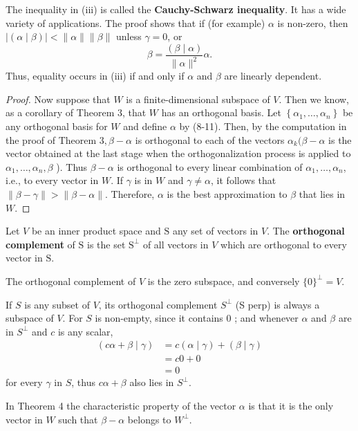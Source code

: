 \documentclass[main.tex]{subfiles}
\begin{document}
The inequality in (iii) is called the \textbf{Cauchy-Schwarz inequality}. It has a wide variety of applications. The proof shows that if (for example) $\alpha$ is non-zero, then $|(\alpha \mid \beta)|<\|\alpha\|\|\beta\|$ unless $\gamma = 0$, or
$$
\beta=\frac{(\beta \mid \alpha)}{\|\alpha\|^2} \alpha .
$$
Thus, equality occurs in (iii) if and only if $\alpha$ and $\beta$ are linearly dependent.


\begin{proof}
    Now suppose that $W$ is a finite-dimensional subspace of $V$. Then we know, as a corollary of Theorem 3, that $W$ has an orthogonal basis. Let $\left\{\alpha_1, \ldots, \alpha_n\right\}$ be any orthogonal basis for $W$ and define $\alpha$ by (8-11). Then, by the computation in the proof of Theorem $3, \beta-\alpha$ is orthogonal to each of the vectors $\alpha_k(\beta-\alpha$ is the vector obtained at the last stage when the orthogonalization process is applied to $\alpha_1, \ldots, \alpha_n, \beta$ ). Thus $\beta-\alpha$ is orthogonal to every linear combination of $\alpha_1, \ldots, \alpha_n$, i.e., to every vector in $W$. If $\gamma$ is in $W$ and $\gamma \neq \alpha$, it follows that $\|\beta-\gamma\|>\|\beta-\alpha\|$. Therefore, $\alpha$ is the best approximation to $\beta$ that lies in $W$.
\end{proof}

\begin{definition}
    Let $V$ be an inner product space and $\mathrm{S}$ any set of vectors in $V$. The \textbf{orthogonal complement} of $\mathrm{S}$ is the set $\mathrm{S}^{\perp}$ of all vectors in $V$ which are orthogonal to every vector in $\mathrm{S}$.
\end{definition}

The orthogonal complement of $V$ is the zero subspace, and conversely $\{0\}^{\perp}=V$. 

If $S$ is any subset of $V$, its orthogonal complement $S^{\perp}$ (S perp) is always a subspace of $V$. For $S$ is non-empty, since it contains 0 ; and whenever $\alpha$ and $\beta$ are in $S^{\perp}$ and $c$ is any scalar,
$$
\begin{aligned}
(c \alpha+\beta \mid \gamma) & =c(\alpha \mid \gamma)+(\beta \mid \gamma) \\
& =c 0+0 \\
& =0
\end{aligned}
$$
for every $\gamma$ in $S$, thus $c \alpha+\beta$ also lies in $S^{\perp}$. 

In Theorem 4 the characteristic property of the vector $\alpha$ is that it is the only vector in $W$ such that $\beta-\alpha$ belongs to $W^{\perp}$.
\end{document}

